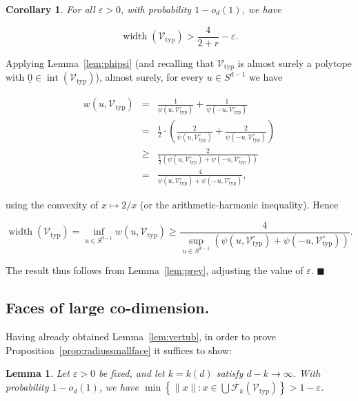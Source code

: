 \documentclass[11pt]{article}%
\newenvironment{proof}{\vspace{1ex}\noindent{\bf Proof.}}{\hspace*{\fill}$\blacksquare$\vspace{1ex}}
\newtheorem{lemma} [theorem] {Lemma}%
\newtheorem{corollary} [theorem] {Corollary}%
\newcommand{\Fcal}[0]{\ensuremath{{\mathcal F}}}
\newcommand{\Vcal}[0]{\ensuremath{{\mathcal V}}}
\newcommand{\norm}[1]{\ensuremath{\|#1\|}}
\newcommand{\eps}{\varepsilon}
\newcommand{\orig}{\underline{0}}
\DeclareMathOperator{\inter}{int}
\DeclareMathOperator{\width}{width}
\newcommand{\Vtyp}[0]{\Vcal_{\text{typ}}}
\begin{document}
\begin{corollary}
 For all $\eps > 0$, with probability $1-o_d(1)$, we have 
 
 $$ \width(\Vtyp) > \frac{4}{2+r} - \eps. $$
 
\end{corollary}

\begin{proof}
Applying Lemma~\ref{lem:phipsi} (and recalling that $\Vtyp$ is almost surely a polytope with $\orig \in \inter(\Vtyp)$), 
almost surely, for every $u \in S^{d-1}$ we have 

$$ \begin{array}{rcl} 
w(u,\Vtyp)
& = & \displaystyle 
\frac{1}{\psi(u,\Vtyp^{\circ})} + \frac{1}{\psi(-u,\Vtyp^{\circ})} \\[2ex]
& = & \displaystyle  
\frac12 \cdot \left( \frac{2}{\psi(u,\Vtyp^{\circ})} + \frac{2}{\psi(-u,\Vtyp^{\circ})} \right) \\[2ex]
& \geq & \displaystyle 
\frac{2}{ \frac12 \left( \psi(u,\Vtyp^{\circ}) + \psi(-u,\Vtyp^{\circ}) \right) } \\[2ex]
& = & \displaystyle  
\frac{4}{ \psi(u,\Vtyp^{\circ}) + \psi(-u,\Vtyp^{\circ}) },
\end{array} $$

\noindent
using the convexity of $x \mapsto 2/x$ (or the arithmetic-harmonic inequality).
Hence

$$ \width(\Vtyp) = \inf_{u\in S^{d-1}} w(u,\Vtyp) \geq \frac{4}{\sup_{u\in S^{d-1}}  \left(\psi(u,\Vtyp^{\circ}) + \psi(-u,\Vtyp^{\circ})\right) }. $$

The result thus follows from Lemma~\ref{lem:prev}, adjusting the value of $\eps$.
\end{proof}


\subsection{Faces of large co-dimension.\label{sec:smallface}}



Having already obtained Lemma~\ref{lem:vertub}, in order to prove Proposition~\ref{prop:radiussmallface}
it suffices to show:

\begin{lemma} Let $\eps > 0$ be fixed, and let $k=k(d)$ satisfy $d-k\to\infty$.
 With probability $1-o_d(1)$, we have $\min\left\{ \norm{x} : x \in \bigcup \Fcal_k(\Vtyp)  \right\} > 1-\eps$.
\end{lemma}
\end{document}

